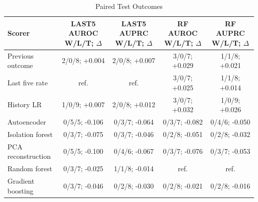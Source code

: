 \begin{table}[htbp]
\centering
\scriptsize\setlength{\tabcolsep}{2pt}
\caption{Paired Test Outcomes}
\label{tab:tally}
\begin{tabular}{p{1.35cm}cccc}
\toprule
Scorer & \shortstack{LAST5\\AUROC\\W/L/T; $\Delta$} & \shortstack{LAST5\\AUPRC\\W/L/T; $\Delta$} & \shortstack{RF\\AUROC\\W/L/T; $\Delta$} & \shortstack{RF\\AUPRC\\W/L/T; $\Delta$} \\
\midrule
Previous outcome & 2/0/8; +0.004 & 2/0/8; +0.007 & 3/0/7; +0.029 & 1/1/8; +0.021 \\
Last five rate & ref. & ref. & 3/0/7; +0.025 & 1/1/8; +0.014 \\
History LR & 1/0/9; +0.007 & 2/0/8; +0.012 & 3/0/7; +0.032 & 1/0/9; +0.026 \\
Autoencoder & 0/5/5; -0.106 & 0/3/7; -0.064 & 0/3/7; -0.082 & 0/4/6; -0.050 \\
Isolation forest & 0/3/7; -0.075 & 0/3/7; -0.046 & 0/2/8; -0.051 & 0/2/8; -0.032 \\
PCA reconstruction & 0/5/5; -0.100 & 0/4/6; -0.067 & 0/3/7; -0.076 & 0/3/7; -0.053 \\
Random forest & 0/3/7; -0.025 & 1/1/8; -0.014 & ref. & ref. \\
Gradient boosting & 0/3/7; -0.046 & 0/2/8; -0.030 & 0/2/8; -0.021 & 0/2/8; -0.016 \\
\bottomrule
\end{tabular}
\end{table}
